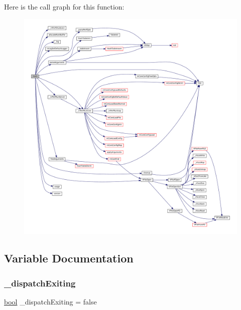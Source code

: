 Here is the call graph for this function\+:
\nopagebreak
\begin{figure}[H]
\begin{center}
\leavevmode
\includegraphics[width=350pt]{perf-main_8c_a3c04138a5bfe5d72780bb7e82a18e627_cgraph}
\end{center}
\end{figure}


\subsection{Variable Documentation}
\mbox{\label{perf-main_8c_a8525f6cde5f9256308f54df6d5b5ba37}} 
\subsubsection{\texorpdfstring{\+\_\+dispatch\+Exiting}{\_dispatchExiting}}
{\footnotesize\ttfamily \mbox{\hyperlink{libretro_8h_a4a26dcae73fb7e1528214a068aca317e}{bool}} \+\_\+dispatch\+Exiting = false\hspace{0.3cm}{\ttfamily [static]}}

\mbox{\label{perf-main_8c_a208165c3b883d1557b33cce53e251cb2}} 
